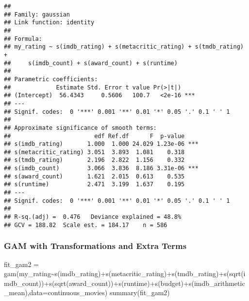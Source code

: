\documentclass[
]{article}
\newenvironment{Shaded}{\begin{snugshade}}{\end{snugshade}}
\newcommand{\AttributeTok}[1]{\textcolor[rgb]{0.77,0.63,0.00}{#1}}
\newcommand{\FunctionTok}[1]{\textcolor[rgb]{0.00,0.00,0.00}{#1}}
\newcommand{\NormalTok}[1]{#1}
\newcommand{\OtherTok}[1]{\textcolor[rgb]{0.56,0.35,0.01}{#1}}
\newcommand{\SpecialCharTok}[1]{\textcolor[rgb]{0.00,0.00,0.00}{#1}}
\begin{document}
\begin{verbatim}
## 
## Family: gaussian 
## Link function: identity 
## 
## Formula:
## my_rating ~ s(imdb_rating) + s(metacritic_rating) + s(tmdb_rating) + 
##     s(imdb_count) + s(award_count) + s(runtime)
## 
## Parametric coefficients:
##             Estimate Std. Error t value Pr(>|t|)    
## (Intercept)  56.4343     0.5606   100.7   <2e-16 ***
## ---
## Signif. codes:  0 '***' 0.001 '**' 0.01 '*' 0.05 '.' 0.1 ' ' 1
## 
## Approximate significance of smooth terms:
##                        edf Ref.df      F  p-value    
## s(imdb_rating)       1.000  1.000 24.029 1.23e-06 ***
## s(metacritic_rating) 3.051  3.893  1.081    0.318    
## s(tmdb_rating)       2.196  2.822  1.156    0.332    
## s(imdb_count)        3.066  3.836  8.186 3.31e-06 ***
## s(award_count)       1.621  2.015  0.613    0.535    
## s(runtime)           2.471  3.199  1.637    0.195    
## ---
## Signif. codes:  0 '***' 0.001 '**' 0.01 '*' 0.05 '.' 0.1 ' ' 1
## 
## R-sq.(adj) =  0.476   Deviance explained = 48.8%
## GCV = 188.82  Scale est. = 184.17    n = 586
\end{verbatim}

\hypertarget{gam-with-transformations-and-extra-terms}{%
\subsubsection{GAM with Transformations and Extra
Terms}\label{gam-with-transformations-and-extra-terms}}

\begin{Shaded}
\begin{Highlighting}[]
\NormalTok{fit\_gam2 }\OtherTok{=} \FunctionTok{gam}\NormalTok{(my\_rating}\SpecialCharTok{\textasciitilde{}}\FunctionTok{s}\NormalTok{(imdb\_rating)}\SpecialCharTok{+}\FunctionTok{s}\NormalTok{(metacritic\_rating)}\SpecialCharTok{+}\FunctionTok{s}\NormalTok{(tmdb\_rating)}\SpecialCharTok{+}\FunctionTok{s}\NormalTok{(}\FunctionTok{sqrt}\NormalTok{(imdb\_count))}\SpecialCharTok{+}\FunctionTok{s}\NormalTok{(}\FunctionTok{sqrt}\NormalTok{(award\_count))}\SpecialCharTok{+}\FunctionTok{s}\NormalTok{(runtime)}\SpecialCharTok{+}\FunctionTok{s}\NormalTok{(budget)}\SpecialCharTok{+}\FunctionTok{s}\NormalTok{(imdb\_arithmetic\_mean),}\AttributeTok{data=}\NormalTok{continuous\_movies)}
\FunctionTok{summary}\NormalTok{(fit\_gam2)}
\end{Highlighting}
\end{Shaded}
\end{document}
